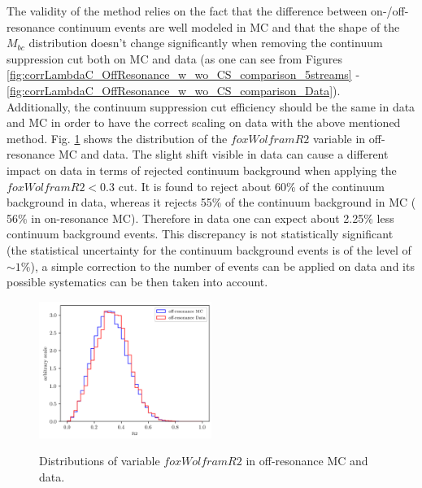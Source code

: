 \noindent The validity of the method relies on the fact that the difference between  on-/off-resonance continuum events are well modeled in MC and that the shape of the $M_{bc}$ distribution doesn't change significantly when removing the continuum suppression cut both on MC and data (as one can see from Figures \ref{fig:corrLambdaC_OffResonance_w_wo_CS_comparison_5streams} - \ref{fig:corrLambdaC_OffResonance_w_wo_CS_comparison_Data}).\\
Additionally, the continuum suppression cut efficiency should be the same in data and MC in order to have the correct scaling on data with the above mentioned method. Fig. \ref{fig:R2_MC-Data_off_resonance_distributions} shows the distribution of the $foxWolframR2$ variable in off-resonance MC and data. The slight shift visible in data can cause a different impact on data in terms of rejected continuum background when applying the $foxWolframR2 < 0.3$ cut. It is found to reject about 60$\%$ of the continuum background in data, whereas it rejects 55$\%$ of the continuum background in MC ( 56$\%$ in on-resonance MC). Therefore in data one can expect about 2.25$\%$ less continuum background events. This discrepancy is not statistically significant (the statistical uncertainty for the continuum background events is of the level of $\sim 1\%$),  a simple correction to the number of events can be applied on data and its possible systematics can be then taken into account.



\begin{figure}
\centering
{\includegraphics[width=0.5\textwidth]{04-SimultaneousFit/figs/R2_MC-Data_off_resonance_distributions.png}}
\caption{Distributions of variable $foxWolframR2$ in off-resonance MC and data.}
\label{fig:R2_MC-Data_off_resonance_distributions}
\end{figure}

